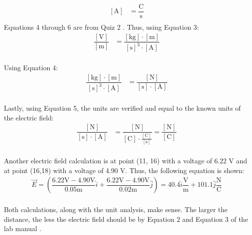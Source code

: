 \documentclass [12pt, letterpaper, twoside] {article}
\begin{document}
\begin{enumerate}
\begin{equation}
  \begin{split}
    [\text{A}] &= \dfrac{\text{C}}{\text{s}} \\
  \end{split}
\end{equation}
Equations 4 through 6 are from Quiz 2 \cite{quiz2}.
Thus, using Equation 3:
\begin{equation*}
  \begin{split}
    \dfrac{[\text{V}]}{[\text{m}]} &= \dfrac{[\text{kg}]\cdot{[\text{m}]}}{[\text{s}]^3\cdot{[\text{A}]}} \\
  \end{split}
\end{equation*}

Using Equation 4:
\begin{equation*}
  \begin{split} 
    \dfrac{[\text{kg}]\cdot{[\text{m}]}}{[\text{s}]^3\cdot{[\text{A}]}} &= \dfrac{[\text{N}]}{[\text{s}]\cdot[\text{A}]} \\
  \end{split}
\end{equation*}

Lastly, using Equation 5, the units are verified and equal to the known units of the electric field:
\begin{equation*}
  \begin{split}
    \dfrac{[\text{N}]}{[\text{s}]\cdot[\text{A}]} &= \dfrac{[\text{N}]}{[\text{C}]\cdot\tfrac{[\text{C}]}{[\text{s}]}} = \dfrac{[\text{N}]}{[\text{C}]} \\
  \end{split}
\end{equation*}

Another electric field calculation is at point (11, 16) with a voltage of 6.22 V and at point (16,18) with a voltage of 4.90 V. Thus, the following equation is shown:
\begin{equation*}
  \begin{split} 
    \vec{E} = \left(\dfrac{6.22\text{V}-4.90\text{V}}{0.05\text{m}}\hat{i}+\dfrac{6.22\text{V}-4.90\text{V}}{0.02\text{m}}\hat{j}\right) = 40.4\hat{i}\dfrac{\text{V}}{\text{m}} + 101.1\hat{j}\dfrac{\text{N}}{\text{C}} \\
  \end{split}
\end{equation*}

Both calculations, along with the unit analysis, make sense. The larger the distance, the less the electric field should be by Equation 2 and Equation 3 of the lab manual \cite{labManual}.


\end{enumerate}
\end{document}
